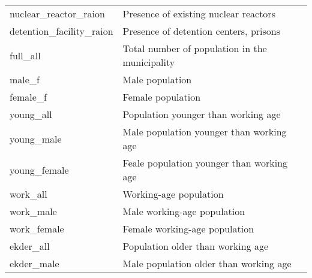 \begin{longtable}[c]{ll}
    nuclear\_reactor\_raion                    & Presence of existing nuclear reactors                                                                                     \\
    detention\_facility\_raion                 & Presence of detention centers, prisons                                                                                    \\
    full\_all                                  & Total number of  population in the municipality                                                                           \\
    male\_f                                    & Male population                                                                                                           \\
    female\_f                                  & Female population                                                                                                         \\
    young\_all                                 & Population younger than working age                                                                                       \\
    young\_male                                & Male population younger than working age                                                                                  \\
    young\_female                              & Feale population younger than working age                                                                                 \\
    work\_all                                  & Working-age population                                                                                                    \\
    work\_male                                 & Male working-age population                                                                                               \\
    work\_female                               & Female working-age population                                                                                             \\
    ekder\_all                                 & Population older than  working age                                                                                        \\
    ekder\_male                                & Male population older than  working age                                                                                   \\

\end{longtable}
